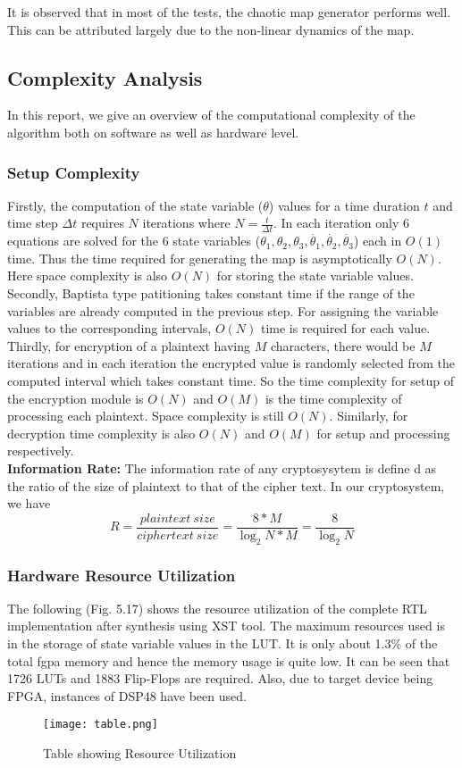 It is observed that in most of the tests, the chaotic map generator performs well. This can be attributed largely due to the non-linear dynamics of the map.

\subsection{Complexity Analysis}

In this report, we give an overview of the computational complexity of the algorithm both on software as well as hardware level.

\subsubsection{Setup Complexity}
Firstly, the computation of the state variable (${\theta}$) values for a time duration $t$ and time step $\Delta t$ requires $N$ iterations where $N= \frac{t}{\Delta t}$. In each iteration only 6 equations are solved for the 6 state variables ($\theta_{1}, \theta_{2}, \theta_{3}, \dot{\theta_{1}}, \dot{\theta_{2}}, \dot{\theta_{3}}$) each in $O(1)$ time. Thus the time required for generating the map is asymptotically $O(N)$. Here space complexity is also $O(N)$ for storing the state variable values. Secondly, Baptista type patitioning takes constant time if the range of the variables are already computed in the previous step. For assigning the variable values to the corresponding intervals, $O(N)$ time is required for each value. Thirdly, for encryption of a plaintext having $M$ characters, there would be $M$ iterations and in each iteration the encrypted value is randomly selected from the computed interval which takes constant time. So the time complexity for setup of the encryption module is $O(N)$ and $O(M)$ is the time complexity of processing each plaintext. Space complexity is still $O(N)$. Similarly, for decryption time complexity is also $O(N)$ and $O(M)$ for setup and processing respectively.\\
\textbf{Information Rate:} The information rate of any cryptosysytem is define d as the ratio of the size of plaintext to that of the cipher text. In our cryptosystem, we have
\begin{equation}
R = \frac{plaintext\ size}{ciphertext\ size} = \frac{8*M}{\log_2N*M} = \frac{8}{\log_2N}
\end{equation}
\subsubsection{Hardware Resource Utilization}
The following (Fig. 5.17) shows the resource utilization of the complete RTL implementation after synthesis using XST tool. The maximum resources used is in the storage of state variable values in the LUT. It is only about 1.3\% of the total fgpa memory and hence the memory usage is quite low. It can be seen that 1726 LUTs and 1883 Flip-Flops are required. Also, due to target device being FPGA, instances of DSP48 have been used.
\begin{figure}[H]
\centering
\texttt{[image: table.png]}
\caption{Table showing Resource Utilization}\label{fig:table}
\end{figure}

